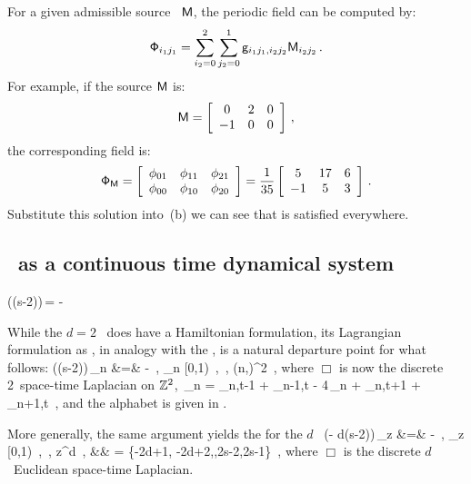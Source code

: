 For a given
admissible source \brick\ $\mathsf{M}$, the periodic field can be computed by:
\[
\mathsf{\Phi}_{i_1 j_1} =
\sum_{i_2=0}^2 \sum_{j_2=0}^1 \mathsf{g}_{i_1 j_1,i_2 j_2} \mathsf{M}_{i_2 j_2} \, .
\]
For example, if the source $\mathsf{M}$ is:
\[
\mathsf{M} =
 \left[
 \begin{array}{ccc}
 0 & 2 & 0 \\
 -1 & 0 & 0
 \end{array}
 \right] \, ,
\]
the corresponding field is:
\[
\mathsf{\Phi}_{\mathsf{M}} =
 \left[
 \begin{array}{ccc}
 \phi_{01} & \phi_{11} & \phi_{21} \\
 \phi_{00} & \phi_{10} & \phi_{20}
 \end{array}
 \right]
 =
 \frac{1}{35}
 \left[
 \begin{array}{ccc}
 5 & 17 & 6 \\
 -1 & 5 & 3
 \end{array}
 \right] \, .
\]
Substitute this solution into \,(b) we
can see that  is satisfied everywhere.

\subsection{{\Tzeta}}
\label{s:catLattZeta}

\subsection{\tempLatt\ as a continuous time dynamical system}
\label{s:catLattODE}

\beq
 ((s-2))\,\Xx = -\Mm
{}

While the $d=2$ \catlatt\ does have a Hamiltonian
formulation, its Lagrangian  formulation as {\sPe}
, in analogy with the {\templatt} , is
a natural departure point for what follows:
\bea
 (({s}-2))\,\ssp_{n\zeit} &=& -
    \,, \qquad
  \ssp_{n\zeit} \in [0,1)
    \,, \quad
   \in \A
    \,, \quad
  (n,\zeit)\in \integers^{2}
\,,
\label{2dCoupledCats}
\eea
where $\Box$ is now the discrete 2\dmn\ space-time Laplacian
on $\mathbb{Z}^2$,
\beq
\Box\,\ssp_{n\zeit} =                   \ssp_{n,t-1} + \ssp_{n-1,t}
                   - 4\,\ssp_{n\zeit} + \ssp_{n,t+1} + \ssp_{n+1,t}
\,,
and the alphabet is given in .

     {
More generally, the same argument yields the {\sPe}  for
the $d$\dmn\ {\em \catlatt}
\bea
 (\Box - d({s}-2))\,\ssp_{z} &=& -
    \,, \qquad
  \ssp_{z} \in [0,1)
    \,, \quad
   \in \A
    \,, \quad
  z\in \integers^{d}
\,,
\continue
 && \A = \{-2d+1, -2d+2,\cdots,2{s}-2,2{s}-1\}
\,,
\label{LinearConn}
\eea
where $\Box$ is the discrete $d$\dmn\ Euclidean space-time Laplacian.
}

